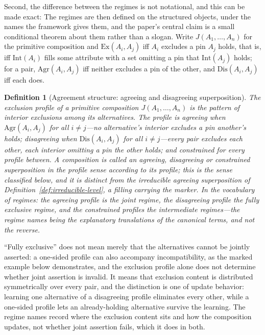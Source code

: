 \documentclass[11pt]{article}
\newtheorem{definition}{Definition}
\begin{document}
Second, the difference between the regimes is not notational, and this can be made exact:
The regimes are then defined on the structured objects, under the names the framework gives them, and the paper's central claim is a small conditional theorem about them rather than a slogan. Write $J(A_1, \ldots, A_n)$ for the primitive composition and $\mathrm{Ex}(A_i, A_j)$ iff $A_i$ excludes a pin $A_j$ holds, that is, iff $\mathrm{Int}(A_i)$ fills some attribute with a set omitting a pin that $\mathrm{Int}(A_j)$ holds; for a pair, $\mathrm{Agr}(A_i, A_j)$ iff neither excludes a pin of the other, and $\mathrm{Dis}(A_i, A_j)$ iff each does.

\begin{definition}[Agreement structure: agreeing and disagreeing superposition]\label{def:agreement}
The \emph{exclusion profile} of a primitive composition $J(A_1, \ldots, A_n)$ is the pattern of interior exclusions among its alternatives. The profile is \emph{agreeing} when $\mathrm{Agr}(A_i, A_j)$ for all $i \ne j$---no alternative's interior excludes a pin another's holds; \emph{disagreeing} when $\mathrm{Dis}(A_i, A_j)$ for all $i \ne j$---every pair excludes each other, each interior omitting a pin the other holds; and \emph{constrained} for every profile between. A composition is called an agreeing, disagreeing or constrained superposition \emph{in the profile sense} according to its profile; this is the sense classified below, and it is distinct from the irreducible agreeing superposition of Definition~\ref{def:irreducible-level}, a filling carrying the marker. In the vocabulary of regimes: the agreeing profile is the joint regime, the disagreeing profile the fully exclusive regime, and the constrained profiles the intermediate regimes---the regime names being the explanatory translations of the canonical terms, and not the reverse.
\end{definition}

\noindent ``Fully exclusive'' does not mean merely that the alternatives cannot be jointly asserted: a one-sided profile can also accompany incompatibility, as the marked example below demonstrates, and the exclusion profile alone does not determine whether joint assertion is invalid. It means that exclusion content is distributed symmetrically over every pair, and the distinction is one of update behavior: learning one alternative of a disagreeing profile eliminates every other, while a one-sided profile lets an already-holding alternative survive the learning. The regime names record where the exclusion content sits and how the composition updates, not whether joint assertion fails, which it does in both.
\end{document}
